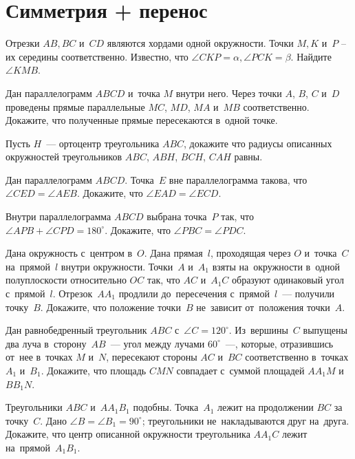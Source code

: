 
\section*{Симметрия + перенос}


\begin{problems}

\item
Отрезки $AB, BC$ и~$CD$ являются хордами одной окружности.
Точки $M,K$ и~$P$ – их середины соответственно.
Известно, что $\angle CKP = \alpha, \angle PCK = \beta$.
Найдите $\angle KMB$.

\item
Дан параллелограмм $ABCD$ и~точка $M$ внутри него.
Через точки $A$, $B$, $C$ и~$D$ проведены прямые параллельные $MC$, $MD$, $MA$
и~$MB$ соответственно.
Докажите, что полученные прямые пересекаются в~одной точке.

\item
Пусть $H$~--- ортоцентр треугольника $ABC$, докажите что радиусы описанных
окружностей треугольников $ABC$, $ABH$, $BCH$, $CAH$ равны.

\item
Дан параллелограмм $ABCD$.
Точка~$E$ вне параллелограмма такова, что $\angle CED = \angle AEB$.
Докажите, что $\angle EAD = \angle ECD$.

\item
Внутри параллелограмма $ABCD$ выбрана точка~$P$ так, что
$\angle APB + \angle CPD = 180^{\circ}$.
Докажите, что $\angle PBC = \angle PDC$.

\item
Дана окружность с~центром в~$O$.
Дана прямая~$l$, проходящая через $O$ и~точка~$C$ на~прямой~$l$ внутри
окружности.
Точки~$A$ и~$A_1$ взяты на~окружности в~одной полуплоскости относительно $OC$
так, что $AC$ и~$A_1 C$ образуют одинаковый угол с~прямой~$l$.
Отрезок~$A A_1$ продлили до~пересечения с~прямой~$l$~--- получили точку~$B$.
Докажите, что положение точки~$B$ не~зависит от~положения точки~$A$.

\item
Дан равнобедренный треугольник $ABC$ с~$\angle C = 120^{\circ}$.
Из~вершины~$C$ выпущены
два луча в~сторону~$AB$~--- угол между лучами $60^{\circ}$~---,
которые, отразившись от~нее в~точках $M$ и~$N$, пересекают стороны $AC$ и~$BC$
соответственно в~точках $A_1$ и~$B_1$.
Докажите, что площадь $CMN$ совпадает с~суммой площадей $A A_1 M$ и~$B B_1 N$.

\item
Треугольники $A B C$ и~$A A_1 B_1$ подобны.
Точка~$A_1$ лежит на продолжении $BC$ за точку~$C$.
Дано $\angle B = \angle B_1 = 90^{\circ}$;
треугольники не~накладываются друг на~друга.
Докажите, что центр описанной окружности треугольника $A A_1 C$ лежит
на~прямой~$A_1 B_1$.

\end{problems}

